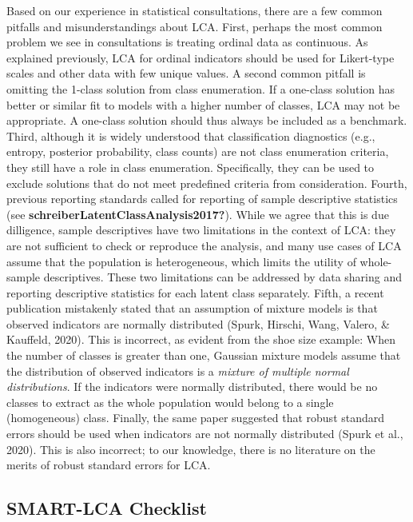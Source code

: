 \documentclass[
  ,man,floatsintext]{apa6}
\begin{document}
Based on our experience in statistical consultations,
there are a few common pitfalls and misunderstandings about LCA.
First, perhaps the most common problem we see in consultations is treating ordinal data as continuous.
As explained previously, LCA for ordinal indicators should be used for Likert-type scales and other data with few unique values.
A second common pitfall is omitting the 1-class solution from class enumeration.
If a one-class solution has better or similar fit to models with a higher number of classes, LCA may not be appropriate.
A one-class solution should thus always be included as a benchmark.
Third, although it is widely understood that classification diagnostics (e.g., entropy, posterior probability, class counts) are not class enumeration criteria,
they still have a role in class enumeration.
Specifically, they can be used to exclude solutions that do not meet predefined criteria from consideration.
Fourth, previous reporting standards called for reporting of sample descriptive statistics (see \textbf{schreiberLatentClassAnalysis2017?}).
While we agree that this is due dilligence,
sample descriptives have two limitations in the context of LCA:
they are not sufficient to check or reproduce the analysis,
and many use cases of LCA assume that the population is heterogeneous, which limits the utility of whole-sample descriptives.
These two limitations can be addressed by data sharing and reporting descriptive statistics for each latent class separately.
Fifth, a recent publication mistakenly stated that an assumption of mixture
models is that observed indicators are normally distributed
(Spurk, Hirschi, Wang, Valero, \& Kauffeld, 2020).
This is incorrect, as evident from the shoe size example:
When the number of classes is greater than one,
Gaussian mixture models assume that the distribution of observed indicators is a \emph{mixture of multiple normal distributions}.
If the indicators were normally distributed,
there would be no classes to extract as the whole population
would belong to a single (homogeneous) class.
Finally, the same paper suggested that robust standard errors
should be used when indicators are not normally distributed
(Spurk et al., 2020).
This is also incorrect;
to our knowledge, there is no literature on the merits of robust standard errors for LCA.

\hypertarget{smart-lca-checklist}{%
\subsection{SMART-LCA Checklist}\label{smart-lca-checklist}}
\end{document}
